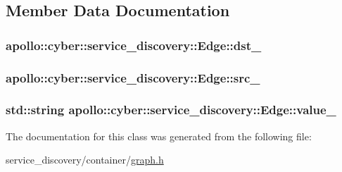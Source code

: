 \subsection{Member Data Documentation}
\hypertarget{classapollo_1_1cyber_1_1service__discovery_1_1Edge_ac1767f0915a805d69f8494562c755d39}{
\subsubsection[{dst\-\_\-}]{ apollo\-::cyber\-::service\-\_\-discovery\-::\-Edge\-::dst\-\_\-\hspace{0.3cm}{\ttfamily [private]}}}\label{classapollo_1_1cyber_1_1service__discovery_1_1Edge_ac1767f0915a805d69f8494562c755d39}
\hypertarget{classapollo_1_1cyber_1_1service__discovery_1_1Edge_a2cb418e47f70d5961d249e7c4ad49e05}{
\subsubsection[{src\-\_\-}]{ apollo\-::cyber\-::service\-\_\-discovery\-::\-Edge\-::src\-\_\-\hspace{0.3cm}{\ttfamily [private]}}}\label{classapollo_1_1cyber_1_1service__discovery_1_1Edge_a2cb418e47f70d5961d249e7c4ad49e05}
\hypertarget{classapollo_1_1cyber_1_1service__discovery_1_1Edge_aa9d24a2d7d30ffea77d8dd52b52483a0}{
\subsubsection[{value\-\_\-}]{\setlength{\rightskip}{0pt plus 5cm}std\-::string apollo\-::cyber\-::service\-\_\-discovery\-::\-Edge\-::value\-\_\-\hspace{0.3cm}{\ttfamily [private]}}}\label{classapollo_1_1cyber_1_1service__discovery_1_1Edge_aa9d24a2d7d30ffea77d8dd52b52483a0}


The documentation for this class was generated from the following file\-:\begin{DoxyCompactItemize}
\item 
service\-\_\-discovery/container/\hyperlink{graph_8h}{graph.\-h}\end{DoxyCompactItemize}
